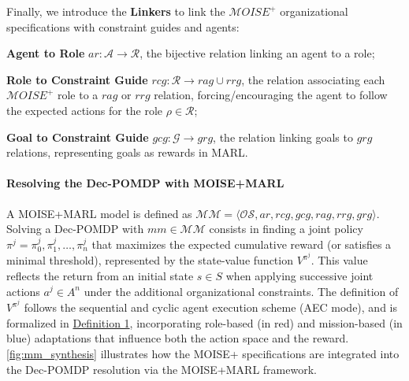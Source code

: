 \documentclass[pdflatex,sn-mathphys-num]{sn-jnl}%
\theoremstyle{thmstyleone}%
\theoremstyle{thmstyletwo}%
\theoremstyle{thmstylethree}%
\begin{document}
\noindent Finally, we introduce the \textbf{Linkers} to link the $\mathcal{M}OISE^+$ organizational specifications with constraint guides and agents:
%
\begin{enumerate*}[label={\roman*) },itemjoin={; \quad}]
    
    \item \textbf{Agent to Role} \quad $ar: \mathcal{A} \to \mathcal{R}$, the bijective relation linking an agent to a role;
    \item \textbf{Role to Constraint Guide} \quad $rcg: \mathcal{R} \rightarrow rag \cup rrg$, the relation associating each $\mathcal{M}OISE^+$ role to a $rag$ or $rrg$ relation, forcing/encouraging the agent to follow the expected actions for the role $\rho \in \mathcal{R}$;
    \item \textbf{Goal to Constraint Guide} \quad $gcg: \mathcal{G} \rightarrow grg$, the relation linking goals to $grg$ relations, representing goals as rewards in MARL.
\end{enumerate*}

\paragraph{\textbf{Resolving the Dec-POMDP with MOISE+MARL}}

A MOISE+MARL model is defined as $\mathcal{MM} = \langle \mathcal{OS}, ar, rcg, gcg, rag, rrg, grg \rangle$.
Solving a Dec-POMDP with $mm \in \mathcal{MM}$ consists in finding a joint policy $\pi^j = {\pi^j_0, \pi^j_1, \dots, \pi^j_n}$ that maximizes the expected cumulative reward (or satisfies a minimal threshold), represented by the state-value function $V^{\pi^j}$. This value reflects the return from an initial state $s \in S$ when applying successive joint actions $a^j \in A^n$ under the additional organizational constraints.
%
The definition of $V^{\pi^j}$ follows the sequential and cyclic agent execution scheme (AEC mode), and is formalized in \hyperref[eq:single_value_function]{Definition 1}, incorporating role-based (in red) and mission-based (in blue) adaptations that influence both the action space and the reward.
\autoref{fig:mm_synthesis} illustrates how the MOISE+ specifications are integrated into the Dec-POMDP resolution via the MOISE+MARL framework.

\medskip
\end{document}
